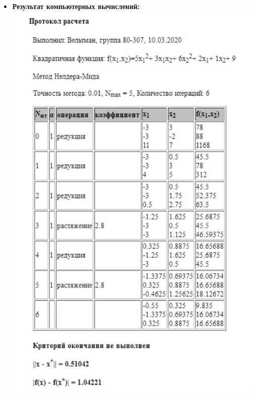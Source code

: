 \begin{itemize}
    {\it Проверим критерий окончания:}\\
    $f(x^{k(1)}) = 78$, $f(x^{k(2)}) = 88$, $f(x^{k(3)}) = 230.125$ \\
    $\overline{f} = \displaystyle\frac{78 + 88 + 230.125}{3} = 132.041667$\\
    
    $\sqrt{\displaystyle\frac{\displaystyle\sum\limits^{3}_{i=1} \left|f(x^{k(i)}) - \overline{f}\right|^2}{n + 1}} = 69.4754403 > 0.01 = \xi$ \\
    $k = 0 < 5 = N_{max}$ \\
    $k = k + 1$\\
    
    {\it Конец первой итерации.}
    
    \item {\bfseries Результат компьютерных вычислений:} \\
    \includegraphics[scale = 0.55]{img/3.PNG}
    
\end{itemize}


